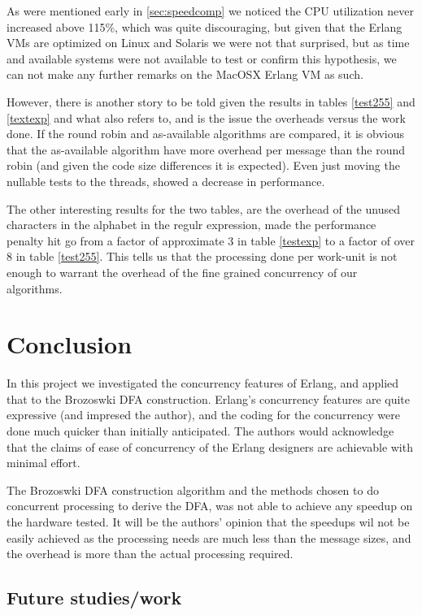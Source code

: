 \documentclass[a4paper,11pt]{report}
\begin{document}
As were mentioned early in \ref{sec:speedcomp} we noticed the CPU
utilization never increased above 115\%, which was quite discouraging,
but given that the Erlang VMs are optimized on Linux and Solaris we
were not that surprised, but as time and available systems were
not available to test or confirm this hypothesis, we can not make any
further remarks on the MacOSX Erlang VM as such.

However, there is another story to be told given the results in tables
\ref{test255} and \ref{textexp} and what \cite{joe:09} also refers
to, and is the issue the overheads versus the work
done. If the round robin and as-available algorithms are compared, it
is obvious that the as-available algorithm have more overhead per
message than the round robin (and given the code size differences it
is expected). Even just moving the nullable tests to the threads,
showed a decrease in performance.

The other interesting results for the two tables, are the overhead of
the unused characters in the alphabet in the regulr expression, made
the performance penalty hit go from a factor of approximate 3 in table
\ref{testexp} to a factor of over 8 in table \ref{test255}.  This
tells us that the processing done per work-unit is not enough to
warrant the overhead of the fine grained concurrency of our
algorithms.

\chapter{Conclusion}


In this project we investigated the concurrency features of Erlang,
and applied that to the Brozoswki DFA construction. Erlang's
concurrency features are quite expressive (and impresed the author),
and the coding for the concurrency were done much quicker than
initially anticipated. The authors would acknowledge that the claims of
ease of concurrency of the Erlang designers are achievable with
minimal effort.

The Brozoswki DFA construction algorithm and the methods chosen to do
concurrent processing to derive the DFA, was not able to achieve any
speedup on the hardware tested. It will be the authors' opinion that
the speedups wil not be easily achieved as the processing needs are
much less than the message sizes, and the overhead is more than the
actual processing required. 

\section{Future studies/work }
\end{document}
